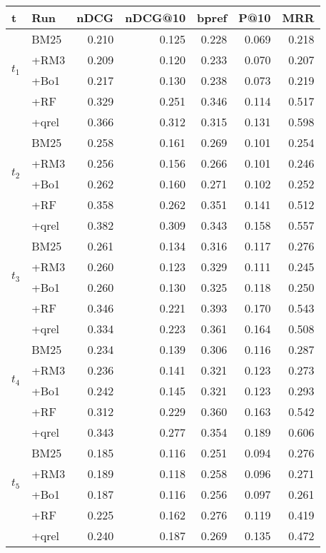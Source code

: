 \begin{tabular}{llrrrrr}
    \toprule
    t & Run & nDCG & nDCG@10 & bpref & P@10 & MRR \\
    \midrule
    \multirow[c]{4}{*}{$t_1$} & BM25 & 0.210 & 0.125 & 0.228 & 0.069 & 0.218 \\
    & +RM3 & 0.209 & 0.120 & 0.233 & 0.070 & 0.207 \\
    & +Bo1 & 0.217 & 0.130 & 0.238 & 0.073 & 0.219 \\
    & +RF & 0.329 & 0.251 & 0.346 & 0.114 & 0.517 \\
    & +qrel & 0.366 & 0.312 & 0.315 & 0.131 & 0.598 \\\midrule
    \multirow[c]{4}{*}{$t_2$} & BM25 & 0.258 & 0.161 & 0.269 & 0.101 & 0.254 \\
    & +RM3 & 0.256 & 0.156 & 0.266 & 0.101 & 0.246 \\
    & +Bo1 & 0.262 & 0.160 & 0.271 & 0.102 & 0.252 \\
    & +RF & 0.358 & 0.262 & 0.351 & 0.141 & 0.512 \\
    & +qrel & 0.382 & 0.309 & 0.343 & 0.158 & 0.557 \\\midrule
    \multirow[c]{4}{*}{$t_3$} & BM25 & 0.261 & 0.134 & 0.316 & 0.117 & 0.276 \\
    & +RM3 & 0.260 & 0.123 & 0.329 & 0.111 & 0.245 \\
    & +Bo1 & 0.260 & 0.130 & 0.325 & 0.118 & 0.250 \\
    & +RF & 0.346 & 0.221 & 0.393 & 0.170 & 0.543 \\
    & +qrel & 0.334 & 0.223 & 0.361 & 0.164 & 0.508 \\\midrule
    \multirow[c]{4}{*}{$t_4$} & BM25 & 0.234 & 0.139 & 0.306 & 0.116 & 0.287 \\
    & +RM3 & 0.236 & 0.141 & 0.321 & 0.123 & 0.273 \\
    & +Bo1 & 0.242 & 0.145 & 0.321 & 0.123 & 0.293 \\
    & +RF & 0.312 & 0.229 & 0.360 & 0.163 & 0.542 \\
    & +qrel & 0.343 & 0.277 & 0.354 & 0.189 & 0.606 \\\midrule
    \multirow[c]{4}{*}{$t_5$} & BM25 & 0.185 & 0.116 & 0.251 & 0.094 & 0.276 \\
    & +RM3 & 0.189 & 0.118 & 0.258 & 0.096 & 0.271 \\
    & +Bo1 & 0.187 & 0.116 & 0.256 & 0.097 & 0.261 \\
    & +RF & 0.225 & 0.162 & 0.276 & 0.119 & 0.419 \\
    & +qrel & 0.240 & 0.187 & 0.269 & 0.135 & 0.472 \\


    \bottomrule
\end{tabular}
    

